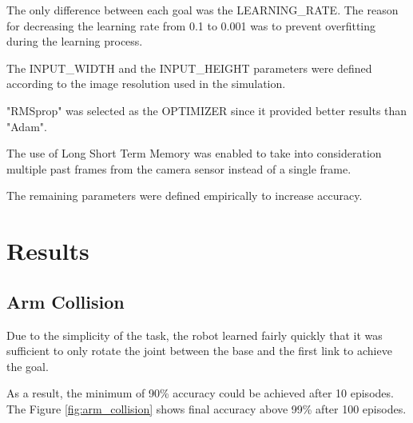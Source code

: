 \documentclass[10pt,journal,compsoc]{IEEEtran}
\begin{document}
The only difference between each goal was the LEARNING\_RATE. The reason for decreasing the learning rate from 0.1 to 0.001 was to prevent overfitting during the learning process. 

The INPUT\_WIDTH and the INPUT\_HEIGHT parameters were defined according to the image resolution used in the simulation.

"RMSprop" was selected as the OPTIMIZER since it provided better results than "Adam". 

The use of Long Short Term Memory was enabled to take into consideration multiple past frames from the camera sensor instead of a single frame.

The remaining parameters were defined empirically to increase accuracy.



\section{Results}

\subsection{Arm Collision}

Due to the simplicity of the task, the robot learned fairly quickly that it was sufficient to only rotate the joint between the base and the first link to achieve the goal. 

As a result, the minimum of 90\% accuracy could be achieved after 10 episodes. The Figure \ref{fig:arm_collision} shows final accuracy above 99\% after 100 episodes.
\end{document}
